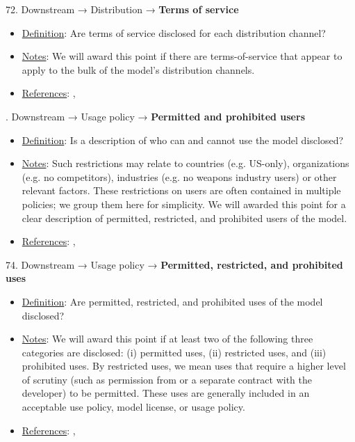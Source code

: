 72. Downstream → Distribution → \textbf{Terms of service}
\vspace{-\parskip}
\begin{itemize}
	\item
	\underline{Definition}: Are terms of service disclosed for each distribution channel?
	\item
	\underline{Notes}: We will award this point if there are terms-of-service that appear to apply to the bulk of the model’s distribution channels.
	\item
	\underline{References}: \citet{rakova2022termsweservewith}, \citet{liu2021identifying}
\end{itemize}


. Downstream → Usage policy → \textbf{Permitted and prohibited users}
\vspace{-\parskip}
\begin{itemize}
	\item
	\underline{Definition}: Is a description of who can and cannot use the model disclosed?
	\item
	\underline{Notes}: Such restrictions may relate to countries (e.g. US-only), organizations (e.g. no competitors), industries (e.g. no weapons industry users) or other relevant factors. These restrictions on users are often contained in multiple policies; we group them here for simplicity. We will awarded this point for a clear description of permitted, restricted, and prohibited users of the model.
	\item
	\underline{References}: \citet{cohere2022}, \citet{meta2023}
\end{itemize}


74. Downstream → Usage policy → \textbf{Permitted, restricted, and prohibited uses}
\vspace{-\parskip}
\begin{itemize}
	\item
	\underline{Definition}: Are permitted, restricted, and prohibited uses of the model disclosed?
	\item
	\underline{Notes}: We will award this point if at least two of the following three categories are disclosed: (i) permitted uses, (ii) restricted uses, and (iii) prohibited uses. By restricted uses, we mean uses that require a higher level of scrutiny (such as permission from or a separate contract with the developer) to be permitted. These uses are generally included in an acceptable use policy, model license, or usage policy.
	\item
	\underline{References}: \citet{cohere2022}, \citet{meta2023}
\end{itemize}


